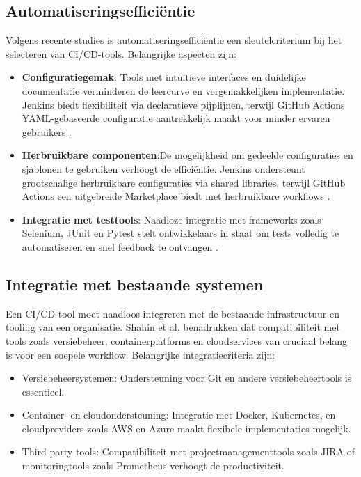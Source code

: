 \subsection{Automatiseringsefficiëntie}

Volgens recente studies \autocite{forsgren2018, githubdocs2023actions} is automatiseringsefficiëntie een sleutelcriterium bij het selecteren van CI/CD-tools. Belangrijke aspecten zijn:
\begin{itemize}
    \item \textbf{Configuratiegemak}: Tools met intuïtieve interfaces en duidelijke documentatie verminderen de leercurve en vergemakkelijken implementatie. Jenkins biedt flexibiliteit via declaratieve pijplijnen, terwijl GitHub Actions YAML-gebaseerde configuratie aantrekkelijk maakt voor minder ervaren gebruikers \autocite{forsgren2018}.
    \item \textbf{Herbruikbare componenten}:De mogelijkheid om gedeelde configuraties en sjablonen te gebruiken verhoogt de efficiëntie. Jenkins ondersteunt grootschalige herbruikbare configuraties via shared libraries, terwijl GitHub Actions een uitgebreide Marketplace biedt met herbruikbare workflows \autocite{githubdocs2023marketplace}.
    \item \textbf{Integratie met testtools}: Naadloze integratie met frameworks zoals Selenium, JUnit en Pytest stelt ontwikkelaars in staat om tests volledig te automatiseren en snel feedback te ontvangen \autocite{smith2023automation}.
\end{itemize}


\subsection{Integratie met bestaande systemen}
Een CI/CD-tool moet naadloos integreren met de bestaande infrastructuur en tooling van een organisatie. Shahin et al. \autocite{shahin2017} benadrukken dat compatibiliteit met tools zoals versiebeheer, containerplatforms en cloudservices van cruciaal belang is voor een soepele workflow.
Belangrijke integratiecriteria zijn: \begin{itemize} \item Versiebeheersystemen: Ondersteuning voor Git en andere versiebeheertools is essentieel. \autocite{springer2023ci} \item Container- en cloudondersteuning: Integratie met Docker, Kubernetes, en cloudproviders zoals AWS en Azure maakt flexibele implementaties mogelijk. \autocite{ieee2021cicd} \item Third-party tools: Compatibiliteit met projectmanagementtools zoals JIRA of monitoringtools zoals Prometheus verhoogt de productiviteit. \end{itemize}

